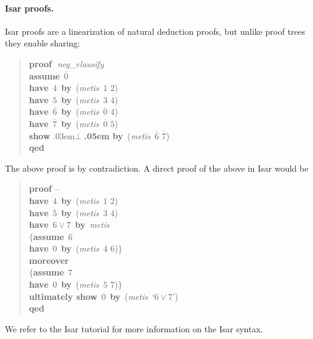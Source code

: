 \documentclass[withtimes,a4paper,12pt]{easychair}
\newcommand\keyw[1]{\textsf{\textbf{#1}}}
\let\B=\overline
\begin{document}
\paragraph{Isar proofs.} Isar proofs are a linearization of natural deduction
proofs, but unlike proof trees they enable sharing:
%
\begin{quote}
\keyw{proof}\,~\textit{neg\_clausify} \\
\hbox{}\quad \keyw{assume}\, $\B{0}$ \\
\hbox{}\quad \keyw{have}\, $4$ \keyw{\,by\,} (\textit{metis\, }$1$ $2$) \\
\hbox{}\quad \keyw{have}\, $5$ \keyw{\,by\,} (\textit{metis\, }$3$ $4$) \\
\hbox{}\quad \keyw{have}\, $\B{6}$ \keyw{\,by\,} (\textit{metis\, }$\B{0}$ $4$) \\
\hbox{}\quad \keyw{have}\, $\B{7}$ \keyw{\,by\,} (\textit{metis\, }$\B{0}$ $5$) \\
\hbox{}\quad \keyw{show} \kern.03em$\bot$ \keyw{\kern.05em by\,} (\textit{metis\, }$\B{6}$ $\B{7}$) \\ %
\keyw{qed}
\end{quote}
%
The above proof is by contradiction. A direct proof of the above in Isar would
be
%
\begin{quote}
\keyw{proof} -- \\
\hbox{}\quad \keyw{have}\, $4$ \keyw{\,by\,} (\textit{metis\, }$1$ $2$) \\
\hbox{}\quad \keyw{have}\, $5$ \keyw{\,by\,} (\textit{metis\, }$3$ $4$) \\
\hbox{}\quad \keyw{have}\, $6 \mathrel{\lor} 7$ \keyw{\,by\,} \textit{metis} \\
\hbox{}\quad $\{$\quad \keyw{assume}\, $6$ \\
\hbox{}\qquad\phantom{$\{$}\keyw{have}\, $0$ \keyw{\,by\,} (\textit{metis\, }$4$ $6$)\quad$\}$ \\
\hbox{}\quad \keyw{moreover} \\
\hbox{}\quad $\{$\quad \keyw{assume}\, $7$ \\
\hbox{}\qquad\phantom{$\{$}\keyw{have}\, $0$ \keyw{\,by\,} (\textit{metis\, }$5$ $7$)\quad$\}$ \\
\hbox{}\quad \keyw{ultimately show}\, $0$ \keyw{\,by\,} (\textit{metis\, }`$6 \mathrel{\lor} 7$') \\
\keyw{qed}
\end{quote}
We refer to the Isar tutorial \cite{nipkow-2011-isar} for more information on
the Isar syntax.
\end{document}
